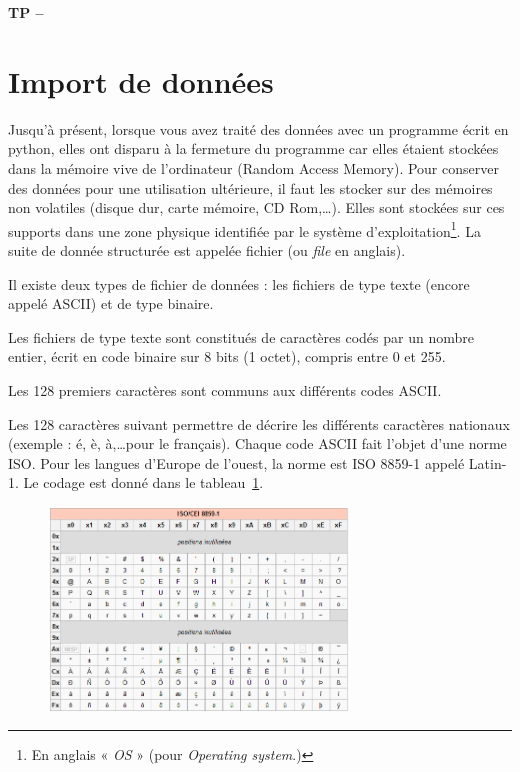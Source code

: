 

%



\begin{center}
{\Large\bf TP \no {\numero} -- \descrip}
\end{center}

\section{Import de données}

Jusqu'à présent, lorsque vous avez traité des données avec un programme écrit en python, elles ont disparu à la fermeture du programme car elles étaient stockées dans la mémoire vive de l'ordinateur (Random Access Memory). Pour conserver des données pour une utilisation ultérieure, il faut les stocker sur des mémoires non volatiles (disque dur, carte mémoire, CD Rom,\dots). Elles sont stockées sur ces supports dans une zone physique identifiée par le système d'exploitation\footnote{En anglais « \textit{OS} » (pour \textit{Operating system}.)}. La suite de donnée structurée est appelée fichier (ou \textit{file} en anglais).

Il existe deux types de fichier de données : les fichiers de type texte (encore appelé ASCII) et de type binaire.

Les fichiers de type texte sont constitués de caractères codés par un nombre entier, écrit en code binaire sur 8 bits (1 octet), compris entre 0 et 255.

Les 128 premiers caractères sont communs aux différents codes ASCII. 

Les 128 caractères suivant permettre de décrire les différents caractères nationaux (exemple : é, è, à,\dots pour le français). Chaque code ASCII fait l'objet d'une norme ISO. Pour les langues d'Europe de l'ouest, la norme est ISO 8859-1 appelé Latin-1. Le codage est donné dans le tableau~\ref{fig:tableASCII}.

\begin{figure}[htp]
 \centering
 \includegraphics[width=8cm]{img/tableASCII}
 \label{fig:tableASCII}
\end{figure}

